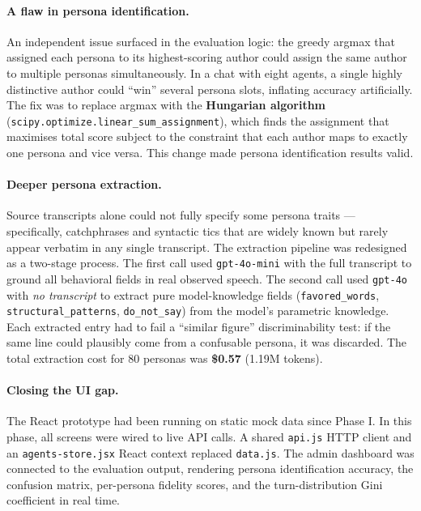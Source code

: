\documentclass[12pt,a4paper]{article}
\begin{document}
\paragraph{A flaw in persona identification.}
An independent issue surfaced in the evaluation logic: the greedy argmax that assigned each
persona to its highest-scoring author could assign the same author to multiple personas
simultaneously. In a chat with eight agents, a single highly distinctive author could ``win''
several persona slots, inflating accuracy artificially. The fix was to replace argmax with the
\textbf{Hungarian algorithm} (\texttt{scipy.optimize.linear\_sum\_assignment}), which
finds the assignment that maximises total score subject to the constraint that each author maps
to exactly one persona and vice versa. This change made persona identification results valid.

\paragraph{Deeper persona extraction.}
Source transcripts alone could not fully specify some persona traits --- specifically,
catchphrases and syntactic tics that are widely known but rarely appear verbatim in any
single transcript. The extraction pipeline was redesigned as a two-stage process. The first
call used \texttt{gpt-4o-mini} with the full transcript to ground all behavioral fields in real
observed speech. The second call used \texttt{gpt-4o} with \emph{no transcript} to extract
pure model-knowledge fields (\texttt{favored\_words}, \texttt{structural\_patterns},
\texttt{do\_not\_say}) from the model's parametric knowledge. Each extracted entry had to fail
a ``similar figure'' discriminability test: if the same line could plausibly come from a
confusable persona, it was discarded. The total extraction cost for 80 personas was
\textbf{\$0.57} (1.19M tokens).

\paragraph{Closing the UI gap.}
The React prototype had been running on static mock data since Phase I. In this phase, all
screens were wired to live API calls. A shared \texttt{api.js} HTTP client and an
\texttt{agents-store.jsx} React context replaced \texttt{data.js}. The admin dashboard was
connected to the evaluation output, rendering persona identification accuracy, the confusion
matrix, per-persona fidelity scores, and the turn-distribution Gini coefficient in real time.
\end{document}
